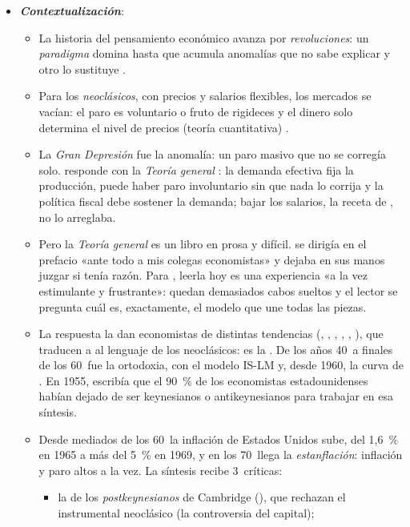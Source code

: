 \documentclass[11pt]{article}
\begin{document}
\begin{itemize}
\item \textbf{\emph{Contextualización}}:
  \begin{itemize}
  \item La historia del pensamiento económico avanza por \emph{revoluciones}: un \emph{paradigma} domina hasta que acumula anomalías que no sabe explicar y otro lo sustituye\nocite{Kuhn1962Structure} .
  \item Para los \emph{neoclásicos}, con precios y salarios flexibles, los mercados se vacían: el paro es voluntario o fruto de rigideces y el dinero solo determina el nivel de precios (teoría cuantitativa) .
  \item La \emph{Gran Depresión} fue la anomalía: un paro masivo que no se corregía solo. \textcite{Keynes1936} responde con la \emph{Teoría general} : la demanda efectiva fija la producción, puede haber paro involuntario sin que nada lo corrija y la política fiscal debe sostener la demanda; bajar los salarios, la receta de , no lo arreglaba.
  \item Pero la \emph{Teoría general} es un libro en prosa y difícil.  se dirigía en el prefacio «ante todo a mis colegas economistas» y dejaba en sus manos juzgar si tenía razón\nocite{Keynes1936}. Para , leerla hoy es una experiencia «a la vez estimulante y frustrante»: quedan demasiados cabos sueltos y el lector se pregunta cuál es, exactamente, el modelo que une todas las piezas\nocite{Mankiw2006Macroeconomist}.
  \item La respuesta la dan economistas de distintas tendencias (, , , , , ), que traducen a  al lenguaje de los neoclásicos: es la . De los años 40~a finales de los 60~fue la ortodoxia, con el modelo IS-LM y, desde 1960, la curva de \nocite{DeVroeyHoover2004Introduction}. En 1955, \textcite[212]{Samuelson1955Economics} escribía que el 90~\% de los economistas estadounidenses habían dejado de ser keynesianos o antikeynesianos para trabajar en esa síntesis.
  \item Desde mediados de los 60~la inflación de Estados Unidos sube, del 1,6~\% en 1965 a más del 5~\% en 1969\nocite{BLS2026IPC}, y en los 70~llega la \emph{estanflación}: inflación y paro altos a la vez. La síntesis recibe 3~críticas:
    \begin{itemize}
    \item la de los \emph{postkeynesianos} de Cambridge (), que rechazan el instrumental neoclásico (la controversia del capital);

\end{itemize}
\end{itemize}
\end{itemize}
\end{document}
